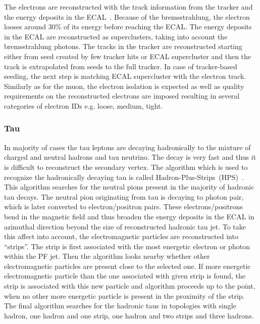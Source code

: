 The electrons are reconstructed with the track information from the tracker and the energy deposits in the ECAL~\cite{Khachatryan:2015hwa}. Because of the bremsstrahlung, the electron looses around 30\% of its energy before reaching the ECAL. The energy deposits in the ECAL are reconstructed as superclusters, taking into account the bremsstrahlung photons. The tracks in the tracker are reconstructed starting either from seed created by few tracker hits or ECAL supercluster and then the track is extrapolated from seeds to the full tracker. In case of tracker-based seeding, the next step is matching ECAL supercluster with the electron track. Similarly as for the muon, the electron isolation is expected as well as quality requirements on the reconstructed electrons are imposed resulting in several categories of electron IDs e.g. loose, medium, tight.

\subsubsection{Tau}

In majority of cases the tau leptons are decaying hadronically to the mixture of charged and neutral hadrons and tau neutrino. The decay is very fast and thus it is difficult to reconstruct the secondary vertex. The algorithm which is used to recognize the hadronically decaying tau is called Hadron-Plus-Strips~(HPS)~\cite{CMS:2016gvn}. This algorithm searches for the neutral pions present in the majority of hadronic tau decays. The neutral pion originating from tau is  decaying to photon pair, which is later converted to electron/positron pairs. These electrons/positrons bend in the magnetic field and thus broaden the energy deposits in the ECAL in azimuthal direction beyond the size of reconstructed hadronic tau jet. To take this affect into account, the electromagnetic particles  are reconstructed into ``strips''. The strip is first associated with the most energetic electron or photon within the PF jet. Then the algorithm looks nearby whether other electromagnetic particles are present close to the selected one. If more energetic electromagnetic particle than the one associated with given strip is found, the strip is associated with this new particle and algorithm proceeds up to the point, when no other more energetic particle is present in the proximity of the strip. The final algorithm searches for the hadronic taus in topologies with single hadron, one hadron and one strip, one hadron and two strips and three hadrons.

